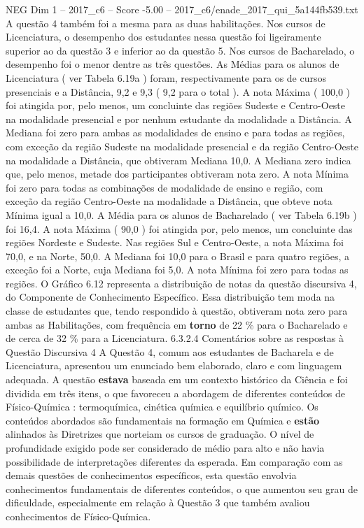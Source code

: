 \begin{textsample}{NEG Dim 1 – 2017\_c6 – Score -5.00 – 2017\_c6/enade\_2017\_qui\_5a144fb539.txt}
A questão 4 também foi a mesma para as duas habilitações.
Nos cursos de Licenciatura, o desempenho dos estudantes nessa questão foi ligeiramente superior ao da questão 3 e inferior ao da questão 5.
Nos cursos de Bacharelado, o desempenho foi o menor dentre as três questões.
As Médias para os alunos de Licenciatura ( ver Tabela 6.19a ) foram, respectivamente para os de cursos presenciais e a Distância, 9,2 e 9,3 ( 9,2 para o total ).
A nota Máxima ( 100,0 ) foi atingida por, pelo menos, um concluinte das regiões Sudeste e Centro-Oeste na modalidade presencial e por nenhum estudante da modalidade a Distância.
A Mediana foi zero para ambas as modalidades de ensino e para todas as regiões, com exceção da região Sudeste na modalidade presencial e da região Centro-Oeste na modalidade a Distância, que obtiveram Mediana 10,0.
A Mediana zero indica que, pelo menos, metade dos participantes obtiveram nota zero.
A nota Mínima foi zero para todas as combinações de modalidade de ensino e região, com exceção da região Centro-Oeste na modalidade a Distância, que obteve nota Mínima igual a 10,0.
A Média para os alunos de Bacharelado ( ver Tabela 6.19b ) foi 16,4.
A nota Máxima ( 90,0 ) foi atingida por, pelo menos, um concluinte das regiões Nordeste e Sudeste.
Nas regiões Sul e Centro-Oeste, a nota Máxima foi 70,0, e na Norte, 50,0.
A Mediana foi 10,0 para o Brasil e para quatro regiões, a exceção foi a Norte, cuja Mediana foi 5,0.
A nota Mínima foi zero para todas as regiões.
O Gráfico 6.12 representa a distribuição de notas da questão discursiva 4, do Componente de Conhecimento Específico.
Essa distribuição tem moda na classe de estudantes que, tendo respondido à questão, obtiveram nota zero para ambas as Habilitações, com frequência em \textbf{torno} de 22 \% para o Bacharelado e de cerca de 32 \% para a Licenciatura. 6.3.2.4 Comentários sobre as respostas à Questão Discursiva 4 A Questão 4, comum aos estudantes de Bacharela e de Licenciatura, apresentou um enunciado bem elaborado, claro e com linguagem adequada.
A questão \textbf{estava} baseada em um contexto histórico da Ciência e foi dividida em três itens, o que favoreceu a abordagem de diferentes conteúdos de Físico-Química : termoquímica, cinética química e equilíbrio químico.
Os conteúdos abordados são fundamentais na formação em Química e \textbf{estão} alinhados às Diretrizes que norteiam os cursos de graduação.
O nível de profundidade exigido pode ser considerado de médio para alto e não havia possibilidade de interpretações diferentes da esperada.
Em comparação com as demais questões de conhecimentos específicos, esta questão envolvia conhecimentos fundamentais de diferentes conteúdos, o que aumentou seu grau de dificuldade, especialmente em relação à Questão 3 que também avaliou conhecimentos de Físico-Química.

\end{textsample}
